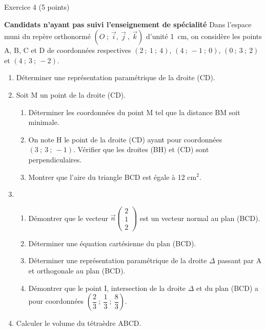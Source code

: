 
\begin{h2}Exercice 4 (5 points)\end{h2}
\textbf{Candidats n'ayant pas suivi l'enseignement de spécialité}
\medskip
Dans l'espace muni du repère orthonormé $(O~;~\overrightarrow{i},~\overrightarrow{j}~,~\overrightarrow{k})$ d'unité 1~cm, on considère les points
A, B, C et D de coordonnées respectives $(2~;~1~;~4)$, $(4~;~-1~;~0)$, $(0~;~3~;~2)$ et $(4~;~3~;~-2)$.
\medskip
\begin{enumerate}
     \item Déterminer une représentation paramétrique de la droite (CD).
     \item Soit M un point de la droite (CD).
     \begin{enumerate}[label=\alph*.]
          \item Déterminer les coordonnées du point M tel que la distance BM soit minimale.
          \item On note H le point de la droite (CD) ayant pour coordonnées $(3~;~3~;~- 1)$.
          Vérifier que les droites (BH) et (CD) sont perpendiculaires.
          \item Montrer que l'aire du triangle BCD est égale à 12 cm$^2$.
     \end{enumerate}
     \item
     \begin{enumerate}[label=\alph*.]
          \item Démontrer que le vecteur $\overrightarrow{n}\begin{pmatrix}2\\1\\2\end{pmatrix}$  est un vecteur normal au plan (BCD).
          \item Déterminer une équation cartésienne du plan (BCD).
          \item Déterminer une représentation paramétrique de la droite $\Delta$ passant par A et orthogonale
          au plan (BCD).
          \item Démontrer que le point I, intersection de la droite $\Delta$ et du plan (BCD) a pour
          coordonnées $\left(\dfrac{2}{3}~;~\dfrac{1}{3}~;~\dfrac{8}{3}\right)$.
     \end{enumerate}
     \item  Calculer le volume du tétraèdre ABCD.
\end{enumerate}
